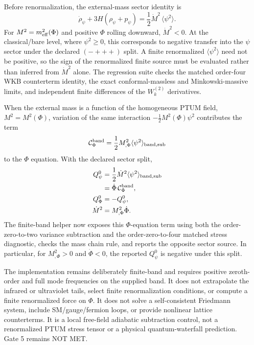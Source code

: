 \documentclass[epj]{svjour}
\begin{document}
Before renormalization, the external-mass sector identity is
\begin{equation}
\dot\rho_\psi+3H(\rho_\psi+p_\psi)
=\frac12\dot M^2\,\langle\psi^2\rangle .
\end{equation}
For $M^2=m_{\rm eff}^2(\Phi)$ and positive $\Phi$ rolling downward,
$\dot M^2<0$. At the classical/bare level, where $\psi^2\geq0$, this
corresponds to negative transfer into the $\psi$ sector under the
declared $(-+++)$ split. A finite renormalized $\langle\psi^2\rangle$
need not be positive, so the sign of the renormalized finite source
must be evaluated rather than inferred from $\dot M^2$ alone. The
regression suite checks the matched order-four WKB counterterm identity,
the exact conformal-massless and Minkowski-massive limits, and
independent finite differences of the $W_k^{(2)}$ derivatives.

When the external mass is a function of the homogeneous PTUM field,
$M^2=M^2(\Phi)$, variation of the same interaction
$-\tfrac12M^2(\Phi)\psi^2$ contributes the term
\begin{equation}
\mathcal C_\Phi^{\rm band}
=\frac12 M^2_{,\Phi}
\langle\psi^2\rangle_{\rm band,sub}
\end{equation}
to the $\Phi$ equation. With the declared sector split,
\begin{align}
Q_\psi^0
&=\frac12\dot M^2\langle\psi^2\rangle_{\rm band,sub}\\
&=\dot\Phi\,\mathcal C_\Phi^{\rm band},\\
Q_\Phi^0&=-Q_\psi^0,\\
\dot M^2&=M^2_{,\Phi}\dot\Phi .
\end{align}
The finite-band helper now exposes this $\Phi$-equation term using both
the order-zero-to-two variance subtraction and the order-zero-to-four
matched stress diagnostic, checks the mass chain rule, and reports the
opposite sector source. In particular, for $M^2_{,\Phi}>0$ and
$\dot\Phi<0$, the reported $Q_\psi^0$ is negative under this split.

The implementation remains deliberately finite-band and requires positive
zeroth-order and full mode frequencies on the supplied band. It does
not extrapolate the infrared or ultraviolet tails, select finite
renormalization conditions, or compute a finite renormalized force on
$\Phi$. It does not solve a self-consistent Friedmann system, include
SM/gauge/fermion loops, or provide nonlinear lattice counterterms.
It is a local free-field adiabatic subtraction control, not a
renormalized PTUM stress tensor or a physical quantum-waterfall
prediction. Gate 5 remains NOT MET.
\end{document}
